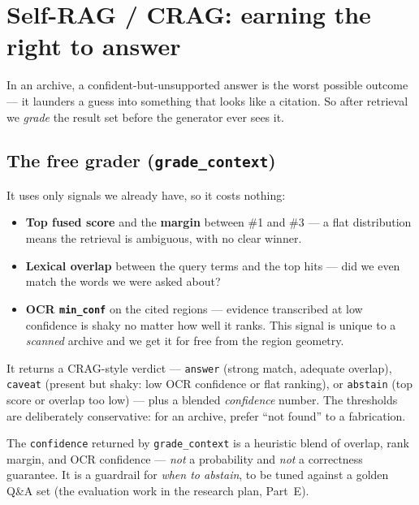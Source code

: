 \documentclass[11pt]{article}
\newcommand{\code}[1]{\texttt{#1}}
\begin{document}
\section{Self-RAG / CRAG: earning the right to answer}

In an archive, a confident-but-unsupported answer is the worst possible outcome --- it launders a
guess into something that looks like a citation. So after retrieval we \emph{grade} the result set
before the generator ever sees it.

\subsection{The free grader (\code{grade\_context})}

It uses only signals we already have, so it costs nothing:

\begin{itemize}[leftmargin=*]
  \item \textbf{Top fused score} and the \textbf{margin} between \#1 and \#3 --- a flat distribution
        means the retrieval is ambiguous, with no clear winner.
  \item \textbf{Lexical overlap} between the query terms and the top hits --- did we even match the
        words we were asked about?
  \item \textbf{OCR \code{min\_conf}} on the cited regions --- evidence transcribed at low confidence
        is shaky no matter how well it ranks. This signal is unique to a \emph{scanned} archive and
        we get it for free from the region geometry.
\end{itemize}

\noindent It returns a CRAG-style verdict --- \code{answer} (strong match, adequate overlap),
\code{caveat} (present but shaky: low OCR confidence or flat ranking), or \code{abstain} (top score
or overlap too low) --- plus a blended \emph{confidence} number. The thresholds are deliberately
conservative: for an archive, prefer ``not found'' to a fabrication.

\begin{caveatbox}
The \code{confidence} returned by \code{grade\_context} is a heuristic blend of overlap, rank margin,
and OCR confidence --- \emph{not} a probability and \emph{not} a correctness guarantee. It is a
guardrail for \emph{when to abstain}, to be tuned against a golden Q\&A set (the evaluation work in
the research plan, Part~E).
\end{caveatbox}
\end{document}
